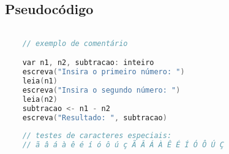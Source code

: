 \documentclass[12pt,a4paper]{article}
\begin{document}
\begin{minipage}{\textwidth}
\subsection*{Pseudocódigo}
\begin{lstlisting}[language=C++]

    // exemplo de comentário

    var n1, n2, subtracao: inteiro
    escreva("Insira o primeiro número: ")
    leia(n1)
    escreva("Insira o segundo número: ")
    leia(n2)
    subtracao <- n1 - n2
    escreva("Resultado: ", subtracao)
    
    // testes de caracteres especiais:
    // ã â á à ê é í ó ô ú ç Ã Â Á À Ê É Í Ó Ô Ú Ç
    
\end{lstlisting}

\end{minipage}

\end{document}
